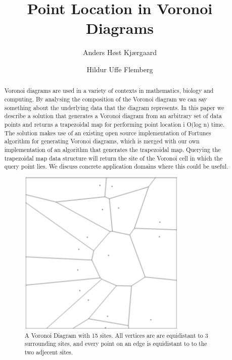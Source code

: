 \documentclass[oribibl]{llncs}
\begin{document}

\mainmatter              %
\title{Point Location in Voronoi Diagrams}

\author{Anders Høst Kjærgaard \and Hildur Uffe Flemberg\\
}


\maketitle              %

\begin{abstract}
Voronoi diagrams are used in a variety of contexts in mathematics, biology and computing. By analysing the composition of the Voronoi diagram we can say something  about the underlying data that the diagram represents. In this paper we describe a solution that generates a Voronoi diagram from an arbitrary set of data points and returns a trapezoidal map for performing point location i O(log n) time. The solution makes use of an existing open source implementation of Fortunes algorithm for generating Voronoi diagrams, which is merged with our own implementation of an algorithm that generates the trapezoidal map. Querying the trapezoidal map data structure will return the site of the Voronoi cell in which the query point lies. We discuss concrete application domains where this could be useful.

\begin{figure}[t]
    \centering
      \includegraphics[width=80mm]{images/voronoi_diagram.pdf}
    \caption{A Voronoi Diagram with 15 sites. All vertices are are equidistant to 3 surrounding sites, and every point on an edge is equidistant to
    to the two adjecent sites. }
    \label{fig:Pipes2IFCWorkflow}
\end{figure}


\end{abstract}











\end{document}
